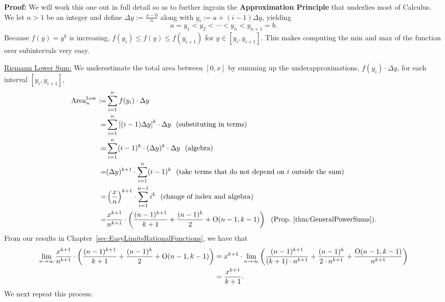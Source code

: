 
\textbf{Proof:} We will work this one out in full detail so as to further ingrain the \textbf{Approximation Principle} that underlies most of Calculus. We let $n>1$ be an integer and define $\Delta y :=\frac{x-0}{n}$ along with 
$y_i:= a + (i-1) \Delta y$, yielding 
$$ a=y_1 < y_2 < \cdots < y_n < y_{n+1} = b.$$
Because $f(y) = y^k$ is increasing, $f(y_i) \le f(y) \le f(y_{i+1})$ for $y \in [y_i, y_{i+1}]$. This makes computing the min and max of the function over subintervals very easy.

\underline{Riemann Lower Sum:}
 We underestimate the total area between $[0, x]$ by summing up the underapproximations, $f(y_i)\cdot \Delta y$, for each interval $[y_i, y_{i+1}]$,
        \begin{equation}
        \begin{aligned}
            {\rm Area}^{\rm Low}_n : =& \sum_{i=1}^n f(y_i)\cdot \Delta y \\
            =& \sum_{i=1}^n \left[  (i-1) \Delta y \right]^k\cdot \Delta y ~~(\text{substituting in terms})\\
            =&  \sum_{i=1}^n   (i-1)^k \cdot  (\Delta y)^k \cdot \Delta y ~~(\text{algebra})\\
            =& (\Delta y)^{k+1} \cdot \sum_{i=1}^n   (i-1)^k ~~(\text{take terms that do not depend on $i$ outside the sum})\\
            =&  \left(\frac{x}{n} \right)^{k+1} \cdot \sum_{i=1}^{n-1}   i^k ~~(\text{change of index and algebra}) \\
            =& \frac{x^{k+1} }{n^{k+1} }\cdot \left( \frac{(n-1)^{k+1}}{k+1} + \frac{(n-1)^k}{2} + \mathrm{O}(n-1,k-1) \right) ~~({\rm Prop}.~\ref{thm:GeneralPowerSums}).
        \end{aligned}            
        \end{equation}
 From our results in Chapter~\ref{sec:EasyLimitsRationalFunctions}, we have that
 \begin{equation}
 \begin{aligned}
      \lim_{n \to \infty} \frac{x^{k+1} }{n^{k+1} }\cdot  \left( \frac{(n-1)^{k+1}}{k+1} + \frac{(n-1)^k}{2} + \mathrm{O}(n-1,k-1) \right) &=  x^{k+1}\cdot\lim_{n \to \infty} \left( \frac{(n-1)^{k+1} }{(k+1) \cdot n^{k+1} } + \frac{(n-1)^k}{2 \cdot n^{k+1}} + \frac{\mathrm{O}(n-1,k-1)}{n^{k+1}} \right)\\
      &=\frac{ x^{k+1} }{k+1}.
 \end{aligned}
 \end{equation}
 We next repeat this process.\\

